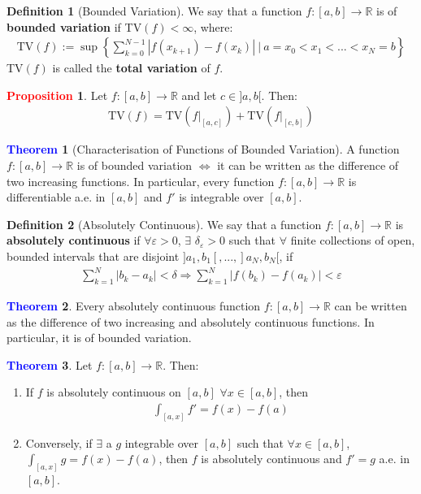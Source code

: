 \documentclass[reqno,11pt]{amsart}
\theoremstyle{definition}
\newcommand{\bb}[1]{\mathbb{#1}}
\newcommand{\sets}[2]{ \left\{ #1\ |\ #2 \right\}}
\newtheorem{theorem}{\textcolor{blue}{Theorem}}
\theoremstyle{definition}
\newtheorem{definition}{\textcolor{OliveGreen}{Definition}}
\newtheorem{prop}{\textcolor{red}{Proposition}}
\theoremstyle{remark}
\begin{document}
\begin{definition}[Bounded Variation]
	We say that a function $f: [a,b] \rightarrow \bb{R}$ is of \textbf{bounded variation} if TV$(f) < \infty$, where: 
	\begin{align}
		\mbox{TV}(f) := \sup \sets{\sum_{k=0}^{N-1} |f(x_{k+1}) - f(x_k) |}{a= x_0 < x_1 < ... < x_N = b}
	\end{align}
	TV$(f)$ is called the \textbf{total variation} of $f$. 
\end{definition}

\begin{prop} Let $f: [a,b] \rightarrow \bb{R}$ and let $c \in ]a, b[$. Then: 
\begin{align*}
	\mbox{TV}(f) = \mbox{TV}(f|_{[a,c]}) 	+  \mbox{TV}(f|_{[c,b]}) 
\end{align*}
\end{prop}

\begin{theorem}[Characterisation of Functions of Bounded Variation] A function $f: [a,b] \rightarrow \bb{R}$ is of bounded variation $\iff$ it can be written as the difference of two increasing functions. In particular, every function $f: [a, b] \rightarrow \bb{R}$ is differentiable a.e. in $[a,b]$ and $f'$ is integrable over $[a,b]$. 
\end{theorem}

\begin{definition}[Absolutely Continuous]
	We say that a function $f: [a,b] \rightarrow \bb{R}$ is \textbf{absolutely continuous} if $\forall \varepsilon > 0$, $\exists$ $\delta_\varepsilon > 0$ such that $\forall$ finite collections of open, bounded intervals that are disjoint $]a_1, b_1[, ..., ]a_N, b_N[$, if 
	\begin{align*}
		\sum_{k=1}^N |b_k - a_k| < \delta 	\Rightarrow 		\sum_{k=1}^N |f(b_k) - f(a_k) | < \varepsilon	
	\end{align*}
\end{definition}

\begin{theorem}
	Every absolutely continuous function $f: [a,b] \rightarrow \bb{R}$ can be written as the difference of two increasing and absolutely continuous functions. In particular, it is of bounded variation. 
\end{theorem}

\begin{theorem}
	Let $f:[a,b] \rightarrow \bb{R}$. Then: 
	\begin{enumerate}[noitemsep]
		\item If $f$ is absolutely continuous on $[a,b]$ $\forall x \in [a,b]$, then 
		\begin{align*}
			\int_{[a,x]} f' = f(x) - f(a) 	
		\end{align*}
		\item Conversely, if $\exists$ a $g$ integrable over $[a,b]$ such that $\forall x \in [a,b]$, $\int_{[a,x]} g = f(x) - f(a)$, then $f$ is absolutely continuous and $f' = g$ a.e. in $[a,b]$. 
	\end{enumerate}
\end{theorem}
\end{document}
